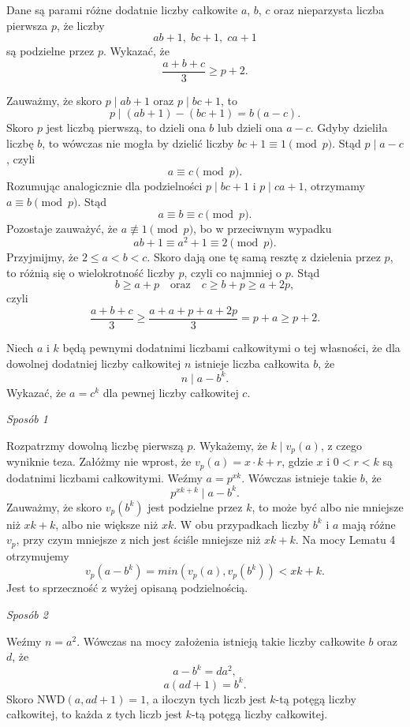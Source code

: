 \begin{problem}{5}
	Dane są parami różne dodatnie liczby całkowite $a$, $b$, $c$ oraz nieparzysta liczba pierwsza $p$, że liczby
	\[
		ab + 1, \; bc + 1, \; ca + 1
	\] 
	są podzielne przez $p$. Wykazać, że
	\[
		\frac{a + b + c}{3} \geqslant p + 2.
	\]
\end{problem}

\noindent
Zauważmy, że skoro $p \mid ab + 1$ oraz $p \mid bc + 1$, to
\[
	p \mid (ab + 1) - (bc + 1) = b(a - c).
\]
Skoro $p$ jest liczbą pierwszą, to dzieli ona $b$ lub dzieli ona $a - c$. Gdyby dzieliła liczbę $b$, to wówczas nie mogła by dzielić liczby $bc + 1 \equiv 1 \pmod{p}$. Stąd $p \mid a - c$, czyli 
\[
	a \equiv c \pmod{p}.
\] 
Rozumując analogicznie dla podzielności $p \mid bc + 1$ i $p \mid ca + 1$, otrzymamy $a \equiv b \pmod{p}$. Stąd
\[
	a \equiv b \equiv c \pmod{p}.
\]
Pozostaje zauważyć, że $a \not\equiv 1 \pmod{p}$, bo w przeciwnym wypadku 
\[
	ab + 1 \equiv a^2 + 1 \equiv 2 \pmod{p}.
\]
Przyjmijmy, że $2 \leqslant a < b < c$. Skoro dają one tę samą resztę z dzielenia przez $p$, to różnią się o wielokrotność liczby $p$, czyli co najmniej o $p$. Stąd
\[
	b \geqslant a + p \quad \text{oraz} \quad c \geqslant b + p \geqslant a + 2p,
\]
czyli
\[
	\frac{a + b + c}{3} \geqslant \frac{a + a + p + a + 2p}{3} = p + a \geqslant p + 2.
\]

\begin{problem}{6}
	Niech $a$ i $k$ będą pewnymi dodatnimi liczbami całkowitymi o tej własności, że dla dowolnej dodatniej liczby całkowitej $n$ istnieje liczba całkowita $b$, że
	\[
		n \mid a - b^k.
	\]
	Wykazać, że $a = c^k$ dla pewnej liczby całkowitej $c$.
\end{problem}

\noindent
\textit{Sposób 1}

\vspace{10px}

\noindent
Rozpatrzmy dowolną liczbę pierwszą $p$. Wykażemy, że $k \mid v_p(a)$, z czego wyniknie teza. Załóżmy nie wprost, że $v_p(a) = x \cdot k + r$, gdzie $x$ i $0 < r < k$ są dodatnimi liczbami całkowitymi. Weźmy $a = p^{xk}$. Wówczas istnieje takie $b$, że
\[
	p^{xk + k} \mid a - b^k.
\]
Zauważmy, że skoro $v_p(b^k)$ jest podzielne przez $k$, to może być albo nie mniejsze niż $xk + k$, albo nie większe niż $xk$. W obu przypadkach liczby $b^k$ i $a$ mają różne $v_p$, przy czym mniejsze z nich jest ściśle mniejsze niż $xk + k$. Na mocy Lematu 4 otrzymujemy 
\[
	v_p(a - b^k) = min(v_p(a), v_p(b^k)) < xk + k.
\]
Jest to sprzeczność z wyżej opisaną podzielnością.

\vspace{10px}

\noindent
\textit{Sposób 2}

\vspace{10px}

\noindent
Weźmy $n = a^2$. Wówczas na mocy założenia istnieją takie liczby całkowite $b$ oraz $d$, że
\[
	a - b^k = da^2,
\]
\[
	a(ad + 1) = b^k.
\]
Skoro $\mathrm{NWD}(a, ad + 1) = 1$, a iloczyn tych liczb jest $k$-tą potęgą liczby całkowitej, to każda z tych liczb jest $k$-tą potęgą liczby całkowitej.

\vspace{10px}

